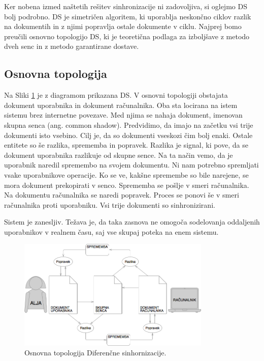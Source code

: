 \documentclass[a4paper, 12pt, twoside]{book}
\begin{document}
Ker nobena izmed naštetih rešitev sinhronizacije ni zadovoljiva, si oglejmo DS bolj podrobno. DS je simetričen algoritem, ki uporablja neskončno ciklov razlik na dokumentih in z njimi popravlja ostale dokumente v ciklu. Najprej bomo preučili osnovno topologijo DS, ki je teoretična podlaga za izboljšave z metodo dveh senc in z metodo garantirane dostave.

\subsection{Osnovna topologija}

Na Sliki \ref{ds1} je z diagramom prikazana DS. V osnovni topologiji obstajata dokument uporabnika in dokument računalnika. Oba sta locirana na istem sistemu brez internetne povezave. Med njima se nahaja dokument, imenovan skupna senca (ang. common shadow). Predvidimo, da imajo na začetku vsi trije dokumenti isto vsebino. Cilj je, da so dokumenti vseskozi čim bolj enaki. Ostale entitete so še razlika, sprememba in popravek. Razlika je signal, ki pove, da se dokument uporabnika razlikuje od skupne sence. Na ta način vemo, da je uporabnik naredil spremembo na svojem dokumentu. Ni nam potrebno spremljati vsake uporabnikove operacije. Ko se ve, kakšne spremembe so bile narejene, se mora dokument prekopirati v senco. Sprememba se pošlje v smeri računalnika. Na dokumentu računalnika se naredi popravek. Proces se ponovi še v smeri računalnika proti uporabniku. Vsi trije dokumenti so sinhronizirani.

Sistem je zanesljiv. Težava je, da taka zasnova ne omogoča sodelovanja oddaljenih uporabnikov v realnem času, saj vse skupaj poteka na enem sistemu.

\begin{figure}[placement h]
\begin{center}
\includegraphics[width=9.2cm]{ds1.png}
\end{center}
\caption{Osnovna topologija Diferenčne sinhornizacije.}
\label{ds1}
\end{figure}
\end{document}
